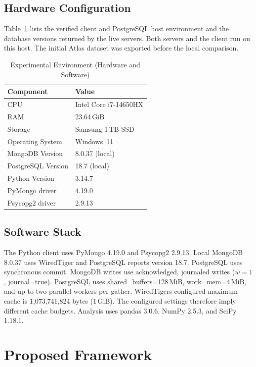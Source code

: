 \documentclass[10pt,a4paper,twocolumn]{article}
\begin{document}
\subsection{Hardware Configuration}
Table~\ref{tab:env} lists the verified client and PostgreSQL host environment and the database versions returned by the live servers. Both servers and the client run on this host. The initial Atlas dataset was exported before the local comparison.

\begin{table}[htbp]
\caption{Experimental Environment (Hardware and Software)}
\label{tab:env}
\centering
\renewcommand{\arraystretch}{1.25}
\begin{tabular}{@{}ll@{}}
\toprule
\textbf{Component}      & \textbf{Value} \\ \midrule
CPU                     & Intel Core i7-14650HX \\
RAM                     & 23.64\,GiB \\
Storage                 & Samsung 1\,TB SSD \\
Operating System        & Windows~11 \\
MongoDB Version         & 8.0.37 (local) \\
PostgreSQL Version      & 18.7 (local) \\
Python Version          & 3.14.7 \\
PyMongo driver          & 4.19.0 \\
Psycopg2 driver         & 2.9.13 \\
\bottomrule
\end{tabular}
\end{table}

\subsection{Software Stack}
The Python client uses PyMongo 4.19.0 and Psycopg2 2.9.13. Local MongoDB 8.0.37 uses WiredTiger and PostgreSQL reports version 18.7. PostgreSQL uses synchronous commit. MongoDB writes use acknowledged, journaled writes ($w=1$, journal=true). PostgreSQL uses shared\_buffers=128\,MiB, work\_mem=4\,MiB, and up to two parallel workers per gather. WiredTiger\textquotesingle s configured maximum cache is 1{,}073{,}741{,}824 bytes (1\,GiB). The configured settings therefore imply different cache budgets. Analysis uses pandas 3.0.6, NumPy 2.5.3, and SciPy 1.18.1.

\section{Proposed Framework}
\end{document}
